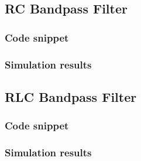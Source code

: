 \documentclass[12pt]{article}
\begin{document}
\subsection{RC Bandpass Filter}
\subsubsection{Code snippet}

\subsubsection{Simulation results}

\subsection{RLC Bandpass Filter}
\subsubsection{Code snippet}

\subsubsection{Simulation results}
\end{document}
